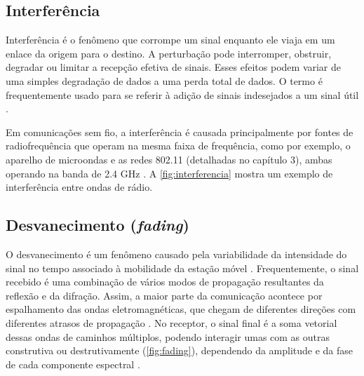 \subsection{Interferência}
\label{sub:interferencia}

Interferência é o fenômeno que corrompe um sinal enquanto ele viaja em um enlace da origem para o destino. A perturbação pode interromper, obstruir, degradar ou limitar a recepção efetiva de sinais. Esses efeitos podem variar de uma simples degradação de dados a uma perda total de dados. O termo é frequentemente usado para se referir à adição de sinais indesejados a um sinal útil \cite{flickenger2008}.

Em comunicações sem fio, a interferência é causada principalmente por fontes de radiofrequência que operam na mesma faixa de frequência, como por exemplo, o aparelho de microondas e as redes 802.11 (detalhadas no capítulo 3), ambas operando na banda de 2.4 GHz \cite{moraes2010}. A \autoref{fig:interferencia} mostra um exemplo de interferência entre ondas de rádio.
\begin{figure}[H]
	\centering
\end{figure}

\subsection{Desvanecimento (\textit{fading})}
\label{sub:desvanecimento}

O desvanecimento é um fenômeno causado pela variabilidade da intensidade do sinal no tempo associado à mobilidade da estação móvel \cite{haykin2008,rappaport2009}. Frequentemente, o sinal recebido é uma combinação de vários modos de propagação resultantes da reflexão e da difração. Assim, a maior parte da comunicação acontece por espalhamento das ondas eletromagnéticas, que chegam de diferentes direções com diferentes atrasos de propagação \cite{haykin2008}. No receptor, o sinal final é a soma vetorial dessas ondas de caminhos múltiplos, podendo interagir umas com as outras construtiva ou destrutivamente (\autoref{fig:fading}), dependendo da amplitude e da fase de cada componente espectral \cite{haykin2008}.

